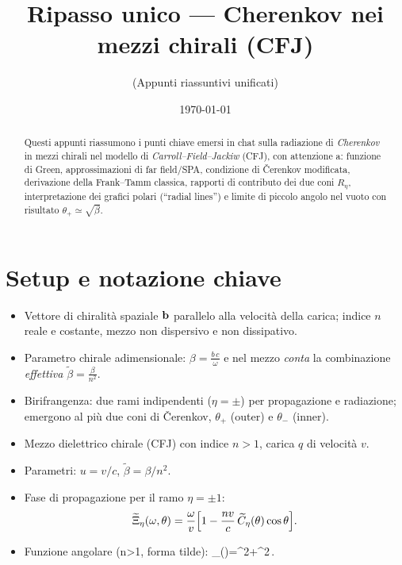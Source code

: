 \documentclass[11pt,a4paper]{article}
\title{Ripasso unico --- Cherenkov nei mezzi chirali (CFJ)}
\author{(Appunti riassuntivi unificati)}
\date{\today}
\newcommand{\wt}[1]{\widetilde{#1}}
\newcommand{\vv}{v}
\newcommand{\cc}{c}
\newcommand{\nn}{n}
\newcommand{\om}{\omega}
\newcommand{\w}{\omega}
\newcommand{\Xit}{\wt{\Xi}}
\newcommand{\Ct}{\wt{C}}
\newcommand{\betat}{\wt{\beta}} %
\newcommand{\bbeta}{\tilde{\beta}}          %
\begin{document}
\maketitle

\begin{abstract}
Questi appunti riassumono i punti chiave emersi in chat sulla radiazione di \emph{Cherenkov} in mezzi chirali nel modello di \textit{Carroll--Field--Jackiw} (CFJ), con attenzione a: funzione di Green, approssimazioni di far field/SPA, condizione di Čerenkov modificata, derivazione della Frank--Tamm classica, rapporti di contributo dei due coni $R_{\eta}$, interpretazione dei grafici polari (``radial lines'') e limite di piccolo angolo nel vuoto con risultato $\theta_{+}\simeq\sqrt{\beta}$.
\end{abstract}

\section{Setup e notazione chiave}
\begin{itemize}
  \item Vettore di chiralità spaziale $\vb{b}$ parallelo alla velocità della carica; indice $n$ reale e costante, mezzo non dispersivo e non dissipativo.
  \item Parametro chirale adimensionale: $\displaystyle \beta=\frac{b\,c}{\w}$ e nel mezzo \emph{conta} la combinazione \emph{effettiva} $\displaystyle \bbeta=\frac{\beta}{n^{2}}$.
  \item Birifrangenza: due rami indipendenti ($\eta=\pm$) per propagazione e radiazione; emergono al più due coni di Čerenkov, $\theta_{+}$ (outer) e $\theta_{-}$ (inner).
\end{itemize}
\begin{itemize}

  \item Mezzo dielettrico chirale (CFJ) con indice $\nn>1$, carica $q$ di velocit\`a $\vv$.
  \item Parametri: $u=\vv/\cc$, $\betat=\beta/\nn^2$.
  \item Fase di propagazione per il ramo $\eta=\pm1$:
  \begin{equation}
    \Xit_\eta(\om,\theta)=\frac{\om}{\vv}\Bigl[1-\frac{\nn \vv}{\cc}\,\Ct_\eta(\theta)\cos\theta\Bigr].
  \end{equation}
  \item Funzione angolare (n>1, forma tilde):
    \Ct_\eta(\theta)=\sin^2\theta+\cos^2\theta\,\sqrt{\,1+\eta\,\betat\,\sec\theta\,}.
\end{itemize}
\end{document}

